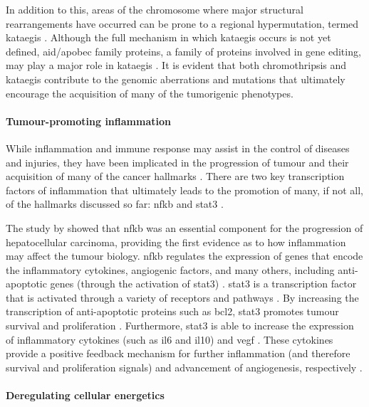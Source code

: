 In addition to this, areas of the chromosome where major structural rearrangements have occurred can be prone to a regional hypermutation, termed \gls{kataegis} \citep{Leibowitz2015,Nik-Zainal2012}.
Although the full mechanism in which \gls{kataegis} occurs is not yet defined, \gls{aid}/\acrshort{apobec} family proteins, a family of proteins involved in gene editing, may play a major role in \gls{kataegis} \citep{Leibowitz2015,Nik-Zainal2012}.
It is evident that both \gls{chromothripsis} and \gls{kataegis} contribute to the genomic aberrations and mutations that ultimately encourage the acquisition of many of the tumorigenic phenotypes.

\paragraph{Tumour-promoting inflammation}

\noindent
While inflammation and immune response may assist in the control of diseases and injuries, they have been implicated in the progression of tumour and their acquisition of many of the cancer hallmarks \citep{Hanahan2011}.
There are two key transcription factors of inflammation that ultimately leads to the promotion  of many, if not all, of the hallmarks discussed so far: \gls{nfkb} and \gls{stat3} \citep{Mantovani2008}.

The study by \citet{Pikarsky2004} showed that \gls{nfkb} was an essential component for the progression of hepatocellular carcinoma, providing the first evidence as to how inflammation may affect the tumour biology.
\gls{nfkb} regulates the expression of genes that encode the inflammatory cytokines, angiogenic factors, and many others, including anti-apoptotic genes (through the activation of \gls{stat3}) \citep{Elinav2013,Mantovani2008}.
\gls{stat3} is a transcription factor that is activated through a variety of receptors and pathways \citep{Yu2007,Yu2014}.
By increasing the transcription of anti-apoptotic proteins such as \gls{bcl2}, \gls{stat3} promotes tumour survival and proliferation \citep{Yu2007}.
Furthermore, \gls{stat3} is able to increase the expression of inflammatory cytokines (such as \gls{il6} and \acrshort{il10}) and \acrshort{vegf} \citep{Yu2007}.
These cytokines provide a positive feedback mechanism for further inflammation (and therefore survival and proliferation signals) and advancement of angiogenesis, respectively \citep{Yu2007}.

\paragraph{Deregulating cellular energetics}

